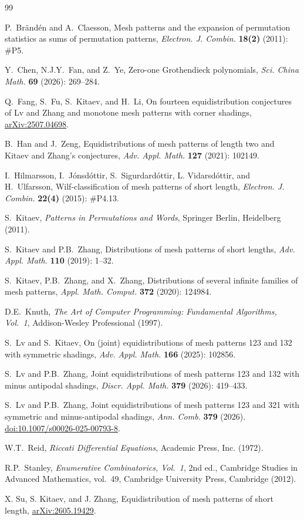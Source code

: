 \documentclass[12pt]{article}
\begin{document}
\begin{thebibliography}{99}

 P.~Br\"and\'en and A.~Claesson, Mesh patterns and the expansion of permutation statistics as sums of permutation patterns, {\it Electron. J. Combin.} {\bf18(2)} (2011): \#P5.

 Y.~Chen, N.J.Y.~Fan, and Z.~Ye, Zero-one Grothendieck polynomials, {\it Sci. China Math.} {\bf69} (2026): 269--284.

 Q.~Fang, S.~Fu, S.~Kitaev, and H.~Li, On fourteen equidistribution conjectures of Lv and Zhang and monotone mesh patterns with corner shadings, \href{https://arxiv.org/abs/2507.04698}{arXiv:2507.04698}.

 B.~Han and J.~Zeng, Equidistributions of mesh patterns of length two and Kitaev and Zhang's conjectures, {\it Adv. Appl. Math.} {\bf127} (2021): 102149.

I.~Hilmarsson, I.~J\'onsd\'ottir, S.~Sigurdard\'ottir, L. Vidarsd\'ottir, and H.~Ulfarsson, Wilf-classification of mesh patterns of short length, {\it Electron. J. Combin.} {\bf 22(4)} (2015): \#P4.13.

 S.~Kitaev, {\it Patterns in Permutations and Words}, Springer Berlin, Heidelberg (2011).

 S.~Kitaev and P.B.~Zhang, Distributions of mesh patterns of short lengths, \textit{Adv. Appl. Math.} {\bf 110} (2019): 1--32.

 S.~Kitaev, P.B.~Zhang, and X.~Zhang, Distributions of several infinite families of mesh patterns, \textit{Appl. Math. Comput.} {\bf 372} (2020): 124984.

 D.E.~Knuth, {\it The Art of Computer Programming: Fundamental Algorithms, Vol.~1}, Addison-Wesley Professional (1997).

 S.~Lv and S.~Kitaev, On (joint) equidistributions of mesh patterns 123 and 132 with symmetric shadings, {\it Adv. Appl. Math.} {\bf166} (2025): 102856.

 S.~Lv and P.B.~Zhang, Joint equidistributions of mesh patterns 123 and 132 with minus antipodal shadings, {\it Discr. Appl. Math.} {\bf379} (2026): 419--433.

 S.~Lv and P.B.~Zhang, Joint equidistributions of mesh patterns 123 and 321 with symmetric and minus-antipodal shadings, {\it Ann. Comb.} {\bf379} (2026). \href{https://doi.org/10.1007/s00026-025-00793-8}{doi:10.1007/s00026-025-00793-8}.

 W.T.~Reid, {\it Riccati Differential Equations}, Academic Press, Inc. (1972).

 R.P.~Stanley, {\it Enumerative Combinatorics, Vol.~1}, 2nd ed., Cambridge Studies in Advanced Mathematics, vol.~49, Cambridge University Press, Cambridge (2012).

 X. Su, S. Kitaev, and J. Zhang, Equidistribution of mesh patterns of short length, \href{https://arxiv.org/abs/2605.19429}{arXiv:2605.19429}.

\end{thebibliography}
\end{document}
